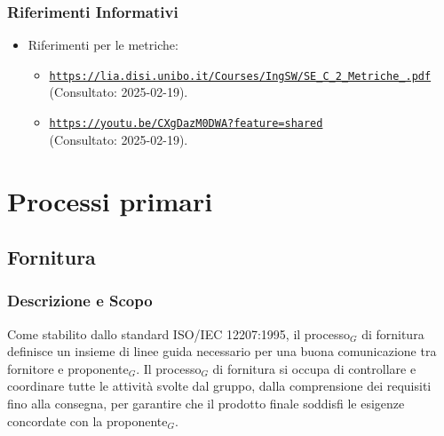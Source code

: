 \documentclass[10pt]{article}
\begin{document}
\begin{justify}
        \subsubsection{Riferimenti Informativi}
        \begin{itemize}
            \item Riferimenti per le metriche: 
            \begin{itemize}
                \item \textcolor{blue}{\texttt{\url{https://lia.disi.unibo.it/Courses/IngSW/SE_C_2_Metriche_.pdf}}}\\
              (Consultato: 2025-02-19).\\
                \item \textcolor{blue}{\texttt{\url{https://youtu.be/CXgDazM0DWA?feature=shared}}}\\
              (Consultato: 2025-02-19).
            \end{itemize}
        \end{itemize}

\newpage
\section{Processi primari}
    \subsection{Fornitura}

    \subsubsection{Descrizione e Scopo}
    Come stabilito dallo standard ISO/IEC 12207:1995, il processo$_G$ di fornitura definisce un insieme di linee guida necessario per una buona comunicazione tra fornitore e proponente$_G$. Il processo$_G$ di fornitura si occupa di controllare e coordinare tutte le attività svolte dal gruppo, dalla comprensione dei requisiti fino alla consegna, per garantire che il prodotto finale soddisfi le esigenze concordate con la proponente$_G$.\\


\end{justify}
\end{document}
